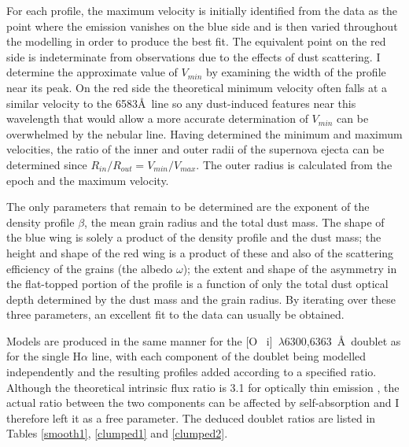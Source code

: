 For each profile, the maximum velocity is initially identified from the 
data as the point where the emission vanishes on the blue side and is then 
varied throughout the modelling in order to produce the best fit.  The 
equivalent point on the red side is indeterminate from observations due to 
the effects of dust scattering.  I determine the approximate value of 
$V_{min}$ by examining the width of the profile near its peak. On the red side the theoretical minimum velocity often 
falls at a similar velocity to the 6583\AA\ line so any dust-induced 
features near this wavelength that would allow a more accurate 
determination of $V_{min}$ can be overwhelmed by the nebular line.  
Having determined the minimum and maximum velocities, the ratio of the 
inner and outer radii of the supernova ejecta can be determined since 
$R_{in}/R_{out}=V_{min}/V_{max}$.  The outer radius is calculated from the 
epoch and the maximum velocity.

The only parameters that  remain to be determined are the exponent of 
the density profile $\beta$, the mean grain radius and the total dust 
mass.  The shape of the blue wing is solely a product of the density 
profile and the dust mass; the height and shape of the red wing is a 
product of these and also of the scattering efficiency of the grains (the 
albedo $\omega$); the extent and shape of the asymmetry in the flat-topped 
portion of the profile is a function of only the total dust optical depth 
determined by the dust mass and the grain radius.  By iterating over these 
three parameters, an excellent fit to the data can usually be 
obtained.

Models are produced in the same manner for the [O~{\sc 
i}]~$\lambda$6300,6363~\AA\ doublet as for the single H$\alpha$ line, with 
each component of the doublet being modelled independently and the 
resulting profiles added according to a specified ratio.  Although the 
theoretical intrinsic flux ratio is 3.1 for optically thin emission \citep{Storey2000}, the 
actual ratio between the two components can be affected by self-absorption 
\citep{Li1992} and I therefore left it as a free parameter.  The deduced 
doublet ratios are listed in Tables \ref{smooth1}, \ref{clumped1} and 
\ref{clumped2}.



